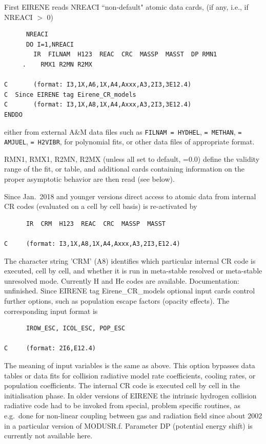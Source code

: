 First EIRENE reads NREACI ``non-default" atomic data cards, (if any, i.e., if
NREACI $>$ 0) 

\begin{lstlisting}
      NREACI
      DO I=1,NREACI
        IR  FILNAM  H123  REAC  CRC  MASSP  MASST  DP RMN1
     .    RMX1 R2MN R2MX

C       (format: I3,1X,A6,1X,A4,Axxx,A3,2I3,3E12.4)
C  Since EIRENE tag Eirene_CR_models
C       (format: I3,1X,A8,1X,A4,Axxx,A3,2I3,3E12.4)
ENDDO
\end{lstlisting} 

either from external A\&M data files such as \lstinline|FILNAM = HYDHEL|,
\lstinline|= METHAN|, \lstinline|= AMJUEL|, \lstinline|= H2VIBR|, for
polynomial fits, or other data files of appropriate format.

RMN1, RMX1, R2MN, R2MX	(unless all set to default, =0.0) define the validity
range of the fit, or table, and additional cards containing information on the
proper asymptotic behavior are then read (see below).

Since Jan.\ 2018 and younger versions direct access to atomic data from
internal CR codes (evaluated on a cell by cell basis) is re-activated by

\begin{lstlisting}
      IR  CRM  H123  REAC  CRC  MASSP  MASST

C     (format: I3,1X,A8,1X,A4,Axxx,A3,2I3,E12.4)
\end{lstlisting} 

The character string 'CRM'  (A8) identifies which particular internal CR
code is executed, cell by cell, and whether it is run in meta-stable resolved
or meta-stable unresolved mode.
Currently H and He codes are available.
Documentation: unfinished.
Since EIRENE tag Eirene\_CR\_models optional input cards control
further options, such as population escape factors (opacity effects).
The corresponding input format is

\begin{lstlisting}
      IROW_ESC, ICOL_ESC, POP_ESC

C     (format: 2I6,E12.4)
\end{lstlisting} 
 

The meaning of input variables is the same as above.
This option bypasses data tables or data fits for collision radiative model
rate coefficients, cooling rates, or population coefficients.
The internal CR code is executed cell by cell in the initialisation phase.
In older versions of EIRENE the intrinsic hydrogen collision radiative code had
to be invoked from special, problem specific routines, as e.g.\ done for
non-linear coupling between gas and radiation field since about 2002 in a
particular version of MODUSR.f.
Parameter DP (potential energy shift) is currently not available here.

